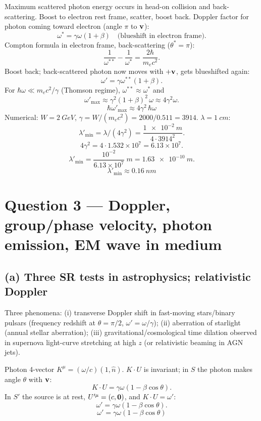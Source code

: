 \documentclass[11pt]{article}
\begin{document}
Maximum scattered photon energy occurs in head-on collision and back-scattering. Boost to electron rest frame, scatter, boost back. Doppler factor for photon coming toward electron (angle $\pi$ to $\vb v$):
\[ \omega^* = \gamma\omega(1 + \beta) \quad\text{(blueshift in electron frame)}. \]
Compton formula in electron frame, back-scattering ($\theta^* = \pi$):
\[ \frac{1}{\omega^{**}} - \frac{1}{\omega^*} = \frac{2\hbar}{m_e c^2}. \]
Boost back; back-scattered photon now moves with $+\vb v$, gets blueshifted again:
\[ \omega' = \gamma\omega^{**}(1+\beta). \]
For $\hbar\omega \ll m_e c^2/\gamma$ (Thomson regime), $\omega^{**}\approx\omega^*$ and
\[ \omega'_\text{max} \approx \gamma^2(1+\beta)^2\,\omega \approx 4\gamma^2\omega. \]
\[ \boxed{\;\hbar\omega'_\text{max} \approx 4\gamma^2\,\hbar\omega\;} \]
Numerical: $W = \SI{2}{GeV}$, $\gamma = W/(m_e c^2) = 2000/0.511 = 3914$. $\lambda = \SI{1}{cm}$:
\[ \lambda'_\text{min} = \lambda/(4\gamma^2) = \frac{\SI{1e-2}{m}}{4\cdot 3914^2}. \]
\[ 4\gamma^2 = 4\cdot 1.532\times 10^{7} = 6.13\times 10^{7}. \]
\[ \lambda'_\text{min} = \frac{10^{-2}}{6.13\times 10^{7}}\;\si{m} = \SI{1.63e-10}{m}. \]
\[ \boxed{\;\lambda'_\text{min} \approx \SI{0.16}{nm}\;} \]

\section*{Question 3 --- Doppler, group/phase velocity, photon emission, EM wave in medium}

\subsection*{(a) Three SR tests in astrophysics; relativistic Doppler}

Three phenomena: (i) transverse Doppler shift in fast-moving stars/binary pulsars (frequency redshift at $\theta=\pi/2$, $\omega'=\omega/\gamma$); (ii) aberration of starlight (annual stellar aberration); (iii) gravitational/cosmological time dilation observed in supernova light-curve stretching at high $z$ (or relativistic beaming in AGN jets).

Photon 4-vector $K^\mu = (\omega/c)(1,\hat n)$. $K\cdot U$ is invariant; in $S$ the photon makes angle $\theta$ with $\vb v$:
\[ K\cdot U = \gamma\omega(1 - \beta\cos\theta). \]
In $S'$ the source is at rest, $U'^\mu = (c,\vb 0)$, and $K\cdot U = \omega'$:
\[ \omega' = \gamma\omega(1-\beta\cos\theta). \]
\[ \boxed{\;\omega' = \gamma\omega(1-\beta\cos\theta)\;} \]
\end{document}
